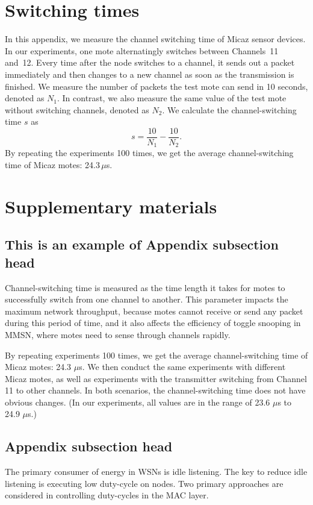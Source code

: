\documentclass[format=acmsmall, review=false]{acmart}
\begin{document}



\appendix
\section{Switching times}

In this appendix, we measure the channel switching time of Micaz
\cite{CROSSBOW} sensor devices.  In our experiments, one mote
alternatingly switches between Channels~11 and~12. Every time after
the node switches to a channel, it sends out a packet immediately and
then changes to a new channel as soon as the transmission is finished.
We measure the number of packets the test mote can send in 10 seconds,
denoted as $N_{1}$. In contrast, we also measure the same value of the
test mote without switching channels, denoted as $N_{2}$. We calculate
the channel-switching time $s$ as
\begin{displaymath}%
s=\frac{10}{N_{1}}-\frac{10}{N_{2}}.
\end{displaymath}%
By repeating the experiments 100 times, we get the average
channel-switching time of Micaz motes: 24.3\,$\mu$s.

\section{Supplementary materials}

	\subsection{This is an example of Appendix subsection head}

	Channel-switching time is measured as the time length it takes for
	motes to successfully switch from one channel to another. This
	parameter impacts the maximum network throughput, because motes
	cannot receive or send any packet during this period of time, and it
	also affects the efficiency of toggle snooping in MMSN, where motes
	need to sense through channels rapidly.

	By repeating experiments 100 times, we get the average
	channel-switching time of Micaz motes: 24.3 $\mu$s. We then conduct
	the same experiments with different Micaz motes, as well as
	experiments with the transmitter switching from Channel 11 to other
	channels. In both scenarios, the channel-switching time does not have
	obvious changes. (In our experiments, all values are in the range of
	23.6 $\mu$s to 24.9 $\mu$s.)

	\subsection{Appendix subsection head}

	The primary consumer of energy in WSNs is idle listening. The key to
	reduce idle listening is executing low duty-cycle on nodes. Two
	primary approaches are considered in controlling duty-cycles in the
	MAC layer.
\end{document}
